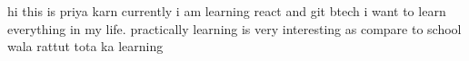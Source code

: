 hi this is priya karn
currently i am learning react and git
btech 
i want to learn everything in my life. practically learning is very interesting as compare to school wala rattut tota ka learning
